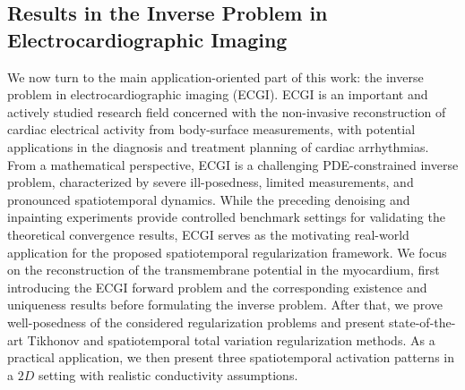 \documentclass{article}
\begin{document}
	\subsection{Results in the Inverse Problem in Electrocardiographic Imaging}
	
	We now turn to the main application-oriented part of this work: the inverse problem in electrocardiographic imaging (ECGI).
	ECGI is an important and actively studied research field concerned with the non-invasive reconstruction of cardiac electrical activity from body-surface measurements, with potential applications in the diagnosis and treatment planning of cardiac arrhythmias.
	From a mathematical perspective, ECGI is a challenging PDE-constrained inverse problem, characterized by severe ill-posedness, limited measurements, and pronounced spatiotemporal dynamics.
	While the preceding denoising and inpainting experiments provide controlled benchmark settings for validating the theoretical convergence results, ECGI serves as the motivating real-world application for the proposed spatiotemporal regularization framework.
	We focus on the reconstruction of the transmembrane potential in the myocardium, first introducing the ECGI forward problem and the corresponding existence and uniqueness results before formulating the inverse problem.
	After that, we prove well-posedness of the considered regularization problems and present state-of-the-art Tikhonov and spatiotemporal total variation regularization methods.
	As a practical application, we then present three spatiotemporal activation patterns in a $2D$ setting with realistic conductivity assumptions.
	
\end{document}
